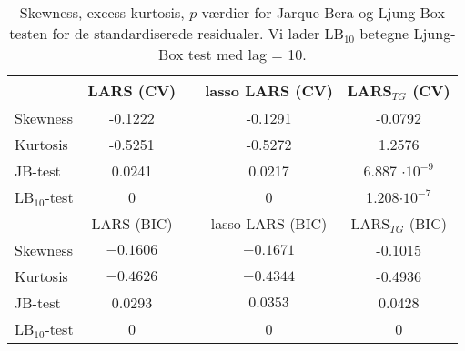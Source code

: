 \begin{table}
\center
\begin{tabular}{lcccc} 
\toprule
& LARS (CV) && lasso LARS  (CV) & LARS$_{TG}$ (CV) \\ \midrule
Skewness & -0.1222 && -0.1291 & -0.0792   \\
Kurtosis & -0.5251  && -0.5272 & 1.2576 \\
JB-test & 0.0241 &&  0.0217 & 6.887 $\cdot 10^{-9}$ \\
LB$_{10}$-test &0 && 0  & 1.208$ \cdot 10^{-7}$  \\  \bottomrule \toprule
& LARS (BIC) && lasso LARS (BIC) &  LARS$_{TG}$ (BIC) \\ \midrule
Skewness & $-0.1606$  && $-0.1671$   & -0.1015 \\
Kurtosis &   $-0.4626$ && $-0.4344 $ & -0.4936  \\
JB-test & 0.0293 &&  $0.0353$ &  0.0428\\
LB$_{10}$-test & 0 && 0  & 0\\  \bottomrule 
\end{tabular}
\caption{Skewness, excess kurtosis, $p$-værdier for Jarque-Bera og Ljung-Box testen for de standardiserede residualer. Vi lader LB$_{10}$ betegne Ljung-Box test med lag = 10. } \label{tab:lars_kryds_res_tab}
\end{table}